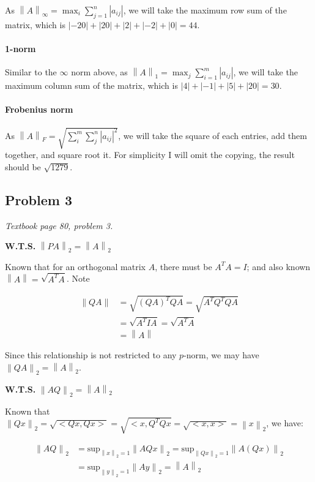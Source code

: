 \documentclass[11pt]{article}
\providecommand{\norm}[1]{\left\lVert #1 \right\rVert}
\providecommand{\len}[1]{\left| #1 \right|}
\begin{document}
As $\norm{A}_\infty = \max_{i} \sum\limits_{j = 1}^{n} \len{a_{ij}}$, we will take the maximum row sum of the matrix, which is $\len{-20} + \len{20} + \len{2} + \len{-2} + \len{0} = 44$.

\paragraph*{1-norm}

Similar to the $\infty$ norm above, as $\norm{A}_1 = \max_{j} \sum\limits_{i = 1}^{m} \len{a_{ij}}$, we will take the maximum column sum of the matrix, which is $\len{4} + \len{-1} + \len{5} + \len{20} = 30$.

\paragraph*{Frobenius norm}

As $\norm{A}_F = \sqrt{\sum\limits_i^m \sum\limits_j^n \len{a_{ij}}^2}$, we will take the square of each entries, add them together, and square root it. For simplicity I will omit the copying, the result should be $\sqrt{1279}$.


\subsection*{Problem 3}
\textit{Textbook page 80, problem 3.}\newline

\textbf{W.T.S.} $\norm{PA}_2 = \norm{A}_2$

Known that for an orthogonal matrix $A$, there must be $A^T A = I$; and also known $\norm{A} = \sqrt{A^T A}$. Note

\begin{align*}
    \norm{QA} &= \sqrt{(QA)^T QA} = \sqrt{A^T Q^T Q A} \\
    &= \sqrt{A^T I A} = \sqrt{A^T A} \\
    &= \norm{A}
\end{align*}

Since this relationship is not restricted to any $p$-norm, we may have $\norm{QA}_2 = \norm{A}_2$.\newline

\textbf{W.T.S.} $\norm{AQ}_2 = \norm{A}_2$

Known that $\norm{Qx}_2 = \sqrt{<Qx, Qx>} = \sqrt{<x, Q^T Q x} = \sqrt{<x, x>} = \norm{x}_2$, we have:

\begin{align*}
    \norm{AQ}_2 &= \text{sup}_{\norm{x}_2 = 1} \norm{AQx}_2 =  \text{sup}_{\norm{Qx}_2 = 1} \norm{A(Qx)}_2 \\
    &= \text{sup}_{\norm{y}_2 = 1} \norm{Ay}_2 = \norm{A}_2
\end{align*}
\end{document}
